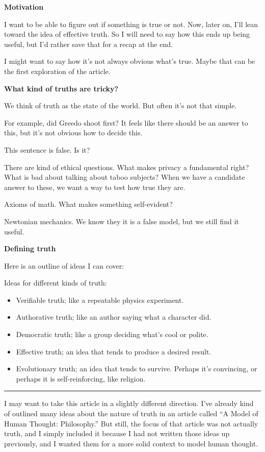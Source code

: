 \documentclass[11pt, oneside]{article}   	%
\begin{document}
{\bf Motivation}

I want to be able to figure out if something is true or not.
Now, later on, I'll lean toward the idea of effective truth.
So I will need to say how this ends up being useful, but I'd rather save
that for a recap at the end.

I might want to say how it's not always obvious what's true.
Maybe that can be the first exploration of the article.

{\bf What kind of truths are tricky?}

We think of truth as the state of the world. But often it's not that simple.

For example, did Greedo shoot first? It feels like there should be an answer to
this, but it's not obvious how to decide this.

This sentence is false. Is it?

There are kind of ethical questions.
What makes privacy a fundamental right?
What is bad about talking about taboo subjects?
When we have a candidate answer to these, we want a way to test how true they
are.

Axioms of math. What makes something self-evident?

Newtonian mechanics. We know they it is a false model, but we still find it
useful.

{\bf Defining truth}

Here is an outline of ideas I can cover:

Ideas for different kinds of truth:
\begin{itemize}
    \item Verifiable truth; like a repeatable physics experiment.
    \item Authorative truth; like an author saying what a character did.
    \item Democratic truth; like a group deciding what's cool or polite.
    \item Effective truth; an idea that tends to produce a desired result.
    \item Evolutionary truth; an idea that tends to survive.
          Perhaps it's convincing, or perhaps it is self-reinforcing, like
          religion.
\end{itemize}

\bigskip
\hrule
\bigskip

I may want to take this article in a slightly different direction. I've already
kind of outlined many ideas about the nature of truth in an article called ``A
Model of Human Thought: Philosophy.'' But still, the focus of that article was
not actually truth, and I simply included it because I had not written those
ideas up previously, and I wanted them for a more solid context to model human
thought.
\end{document}
